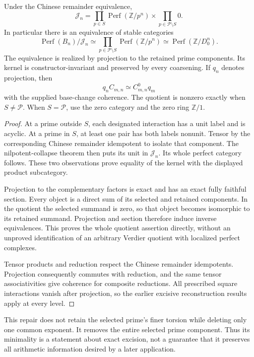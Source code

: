 \begin{theorem}\label{thm:finite-prime-quotient}
Under the Chinese remainder equivalence,
\[
 \boxed{\mathcal J_n=
 \prod_{p\in S}\operatorname{Perf}(\mathbb Z/p^n)
 \times\prod_{p\in\mathcal P\setminus S}0.}
\]
In particular there is an equivalence of stable categories
\[
 \operatorname{Perf}(B_n)/\mathcal J_n
 \simeq \prod_{p\in\mathcal P\setminus S}\operatorname{Perf}(\mathbb Z/p^n)
 \simeq\operatorname{Perf}(\mathbb Z/D_0^n).
\]
The equivalence is realized by projection to the retained prime components. Its kernel is constructor-invariant and preserved by every coarsening. If $q_n$ denotes projection, then
\[
 q_nC_{m,n}\simeq C^0_{m,n}q_m
\]
with the supplied base-change coherence. The quotient is nonzero exactly when $S\ne\mathcal P$. When $S=\mathcal P$, use the zero category and the zero ring $\mathbb Z/1$.
\end{theorem}
\begin{proof}
At a prime outside $S$, each designated interaction has a unit label and is acyclic. At a prime in $S$, at least one pair has both labels nonunit. Tensor by the corresponding Chinese remainder idempotent to isolate that component. The nilpotent-collapse theorem then puts its unit in $\mathcal J_n$. Its whole perfect category follows. These two observations prove equality of the kernel with the displayed product subcategory.

Projection to the complementary factors is exact and has an exact fully faithful section. Every object is a direct sum of its selected and retained components. In the quotient the selected summand is zero, so that object becomes isomorphic to its retained summand. Projection and section therefore induce inverse equivalences. This proves the whole quotient assertion directly, without an unproved identification of an arbitrary Verdier quotient with localized perfect complexes.

Tensor products and reduction respect the Chinese remainder idempotents. Projection consequently commutes with reduction, and the same tensor associativities give coherence for composite reductions. All prescribed square interactions vanish after projection, so the earlier excisive reconstruction results apply at every level.
\end{proof}

This repair does not retain the selected prime's finer torsion while deleting only one common exponent. It removes the entire selected prime component. Thus its minimality is a statement about exact excision, not a guarantee that it preserves all arithmetic information desired by a later application.
